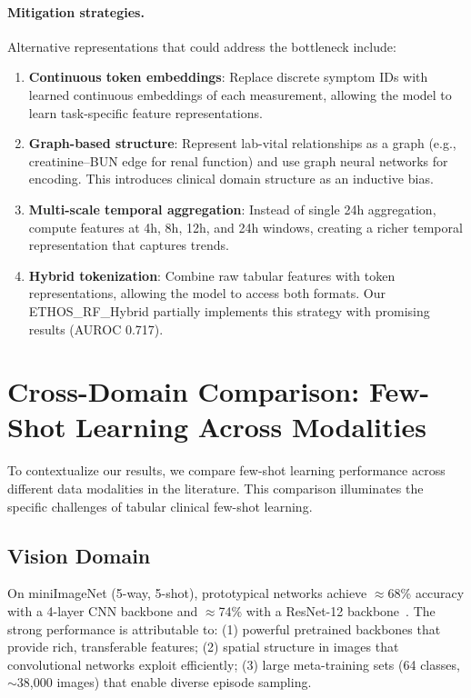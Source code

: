 \paragraph{Mitigation strategies.} Alternative representations that could address the bottleneck include:
\begin{enumerate}
\item \textbf{Continuous token embeddings}: Replace discrete symptom IDs with learned continuous embeddings of each measurement, allowing the model to learn task-specific feature representations.
\item \textbf{Graph-based structure}: Represent lab-vital relationships as a graph (e.g., creatinine--BUN edge for renal function) and use graph neural networks for encoding. This introduces clinical domain structure as an inductive bias.
\item \textbf{Multi-scale temporal aggregation}: Instead of single 24h aggregation, compute features at 4h, 8h, 12h, and 24h windows, creating a richer temporal representation that captures trends.
\item \textbf{Hybrid tokenization}: Combine raw tabular features with token representations, allowing the model to access both formats. Our ETHOS\_RF\_Hybrid partially implements this strategy with promising results (AUROC 0.717).
\end{enumerate}

\section{Cross-Domain Comparison: Few-Shot Learning Across Modalities}

To contextualize our results, we compare few-shot learning performance across different data modalities in the literature. This comparison illuminates the specific challenges of tabular clinical few-shot learning.

\subsection{Vision Domain}

On miniImageNet (5-way, 5-shot), prototypical networks achieve $\approx$68\% accuracy with a 4-layer CNN backbone and $\approx$74\% with a ResNet-12 backbone~\cite{snell2017prototypical}. The strong performance is attributable to: (1) powerful pretrained backbones that provide rich, transferable features; (2) spatial structure in images that convolutional networks exploit efficiently; (3) large meta-training sets (64 classes, $\sim$38,000 images) that enable diverse episode sampling.

